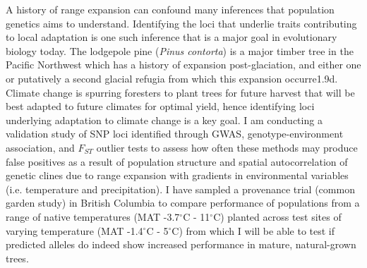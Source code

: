 	A history of range expansion can confound many inferences that population genetics aims to understand. Identifying the loci that underlie traits contributing to local adaptation is one such inference that is a major goal in evolutionary biology today. The lodgepole pine (\emph{Pinus contorta}) is a major timber tree in the Pacific Northwest which has a history of expansion post-glaciation, and either one or putatively a second glacial refugia from which this expansion occurre1.9d. Climate change is spurring foresters to plant trees for future harvest that will be best adapted to future climates for optimal yield, hence identifying loci underlying adaptation to climate change is a key goal. I am conducting a validation study of SNP loci identified through GWAS, genotype-environment association, and $F_{ST}$ outlier tests to assess how often these methods may produce false positives as a result of population structure and spatial autocorrelation of genetic clines due to range expansion with gradients in environmental variables (i.e. temperature and precipitation). I have sampled a provenance trial (common garden study) in British Columbia to compare performance of populations from a range of native temperatures (MAT -3.7$^{\circ}$C - 11$^{\circ}$C) planted across test sites of varying temperature (MAT -1.4$^{\circ}$C - 5$^{\circ}$C) from which I will be able to test if predicted alleles do indeed show increased performance in mature, natural-grown trees.
	


